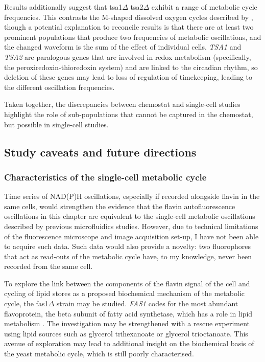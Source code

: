 Results additionally suggest that tsa1$\Delta$ tsa2$\Delta$ exhibit a range of metabolic cycle frequencies.
This contrasts the M-shaped dissolved oxygen cycles described by \textcite{caustonMetabolicCyclesYeast2015}, though a potential explanation to reconcile results is that there are at least two prominent populations that produce two frequencies of metabolic oscillations, and the changed waveform is the sum of the effect of individual cells.
\textit{TSA1} and \textit{TSA2} are paralogous genes that are involved in redox metabolism (specifically, the peroxiredoxin-thioredoxin system) and are linked to the circadian rhythm, so deletion of these genes may lead to loss of regulation of timekeeping, leading to the different oscillation frequencies.

Taken together, the discrepancies between chemostat and single-cell studies highlight the role of sub-populations that cannot be captured in the chemostat, but possible in single-cell studies.


\subsection{Study caveats and future directions}
\label{subsec:biology-discussion-caveats}


\subsubsection{Characteristics of the single-cell metabolic cycle}
\label{subsec:biology-discussion-caveats-characteristics}

Time series of NAD(P)H oscillations, especially if recorded alongside flavin in the same cells, would strengthen the evidence that the flavin autofluorescence oscillations in this chapter are equivalent to the single-cell metabolic oscillations described by previous microfluidics studies.
However, due to technical limitations of the fluorescence microscope and image acquisition set-up, I have not been able to acquire such data.
Such data would also provide a novelty: two fluorophores that act as read-outs of the metabolic cycle have, to my knowledge, never been recorded from the same cell.

To explore the link between the components of the flavin signal of the cell and cycling of lipid stores as a proposed biochemical mechanism of the metabolic cycle, the fas1$\Delta$ strain may be studied.
\textit{FAS1} codes for the most abundant flavoprotein, the beta subunit of fatty acid synthetase, which has a role in lipid metabolism \parencite{gudipatiFlavoproteomeYeastSaccharomyces2014}.
The investigation may be strengthened with a rescue experiment using lipid sources such as glycerol trihexanoate or glycerol trioctanoate.
This avenue of exploration may lead to additional insight on the biochemical basis of the yeast metabolic cycle, which is still poorly characterised.

